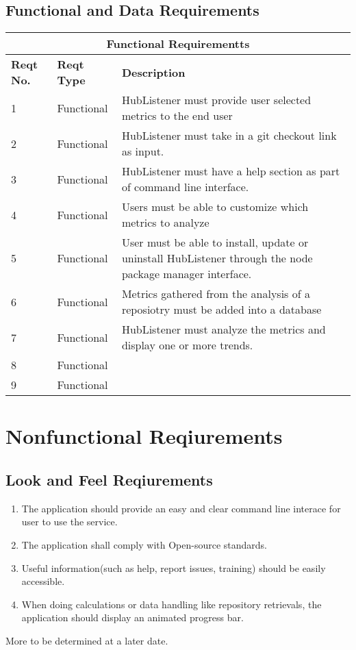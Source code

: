 \documentclass{article}
\begin{document}
\subsection{Functional and Data Requirements }
\begin{tabular}{ |p{1cm}|p{3cm}|p{5cm}| }
 \hline
 \multicolumn{3}{|c|}{\textbf{Functional Requirementts}} \\
 \hline
\textbf{Reqt No.} & \textbf{Reqt Type} & \textbf{Description} \\
\hline 
1 & Functional  & HubListener must provide user selected metrics to the end user\\
\hline 
2 & Functional  &  HubListener must take in a git checkout link as input. \\
\hline 
3 & Functional  & HubListener must have a help section as part of command line interface.\\ 
 \hline 
4 & Functional  & Users must be able to customize which metrics to analyze \\
 \hline 
5 & Functional  & User must be able to install, update or uninstall HubListener through the node package manager interface.\\
 \hline 
6 & Functional  &  Metrics gathered from the analysis of a reposiotry must  be added into a database \\
 \hline 
7 & Functional & HubListener must analyze the metrics and display one or more trends. \\
 \hline 
8 & Functional & \\
 \hline 
9 & Functional & \\
\hline
\end{tabular}


\newpage
\section{Nonfunctional Reqiurements}

\subsection{Look and Feel Reqiurements}
\begin{enumerate}
\item The application should provide an easy and clear command line interace for user to use the service.
\item The application shall comply with Open-source standards.
\item Useful information(such as help, report issues, training) should be easily accessible.
\item When doing calculations or data handling like repository retrievals, the application should display an animated progress bar. 
\end{enumerate}
More to be determined at a later date.
\end{document}
